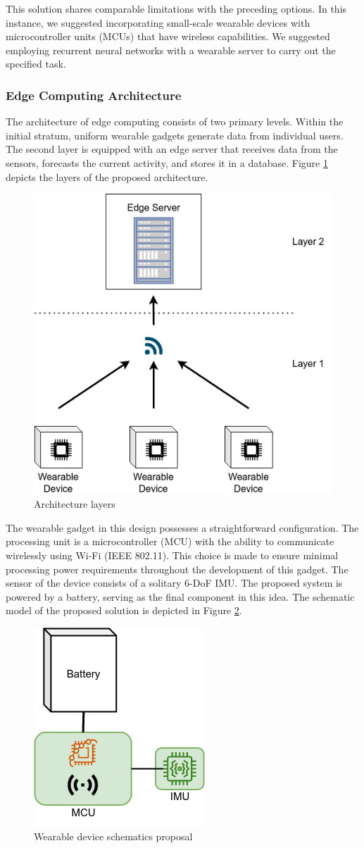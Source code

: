 This solution shares comparable limitations with the preceding options. In this instance, we suggested incorporating small-scale wearable devices with microcontroller units (MCUs) that have wireless capabilities. We suggested employing recurrent neural networks with a wearable server to carry out the specified task.

\subsubsection{Edge Computing Architecture}

The architecture of edge computing consists of two primary levels. Within the initial stratum, uniform wearable gadgets generate data from individual users. The second layer is equipped with an edge server that receives data from the sensors, forecasts the current activity, and stores it in a database. Figure \ref{fig:layers} depicts the layers of the proposed architecture. 

\begin{figure}[h!]
    \centering
    \includegraphics[width = .45\linewidth]{Figures/layers.png}
    \caption{Architecture layers}
    \label{fig:layers}
\end{figure}

The wearable gadget in this design possesses a straightforward configuration. The processing unit is a microcontroller (MCU) with the ability to communicate wirelessly using Wi-Fi (IEEE 802.11). This choice is made to ensure minimal processing power requirements throughout the development of this gadget. The sensor of the device consists of a solitary 6-DoF IMU. The proposed system is powered by a battery, serving as the final component in this idea. The schematic model of the proposed solution is depicted in Figure \ref{fig:wearable}.

\begin{figure}[h!]
    \centering
    \includegraphics[width = 0.3\linewidth]{Figures/wearable.png}
    \caption{Wearable device schematics proposal}
    \label{fig:wearable}
\end{figure}

